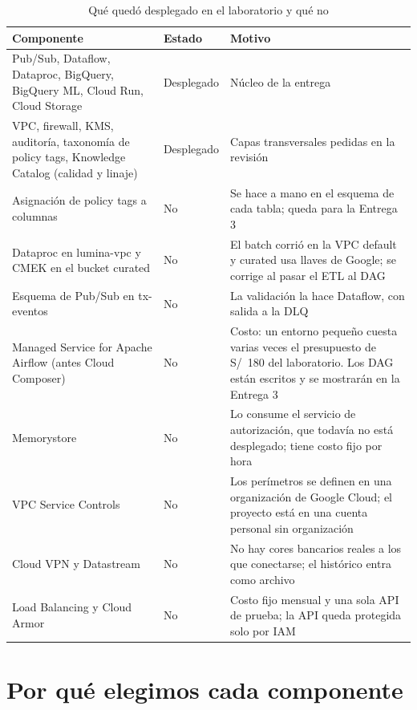 \documentclass[11pt,a4paper]{article}
\DeclareRobustCommand{\cod}[1]{{\small\ttfamily\codbreaks #1}}
\DeclareRobustCommand{\codbreaks}{\let\oldus\_\renewcommand{\_}{\oldus\allowbreak}}
\begin{document}
\begin{table}[H]
\centering\small
\caption{Qué quedó desplegado en el laboratorio y qué no}
\label{tab:desplegado}
\begin{tabularx}{\linewidth}{P{3.6cm}P{2cm}L}
\toprule
\textbf{Componente} & \textbf{Estado} & \textbf{Motivo}\\
\midrule
Pub/Sub, Dataflow, Dataproc, BigQuery, BigQuery ML, Cloud Run, Cloud Storage & Desplegado & Núcleo de la entrega\\
 VPC, firewall, KMS, auditoría, taxonomía de policy tags, Knowledge Catalog (calidad y linaje) & Desplegado & Capas transversales pedidas en la revisión\\
Asignación de policy tags a columnas & No & Se hace a mano en el esquema de cada tabla; queda para la Entrega 3\\
 Dataproc en \cod{lumina-vpc} y CMEK en el bucket curated & No & El batch corrió en la VPC \cod{default} y curated usa llaves de Google; se corrige al pasar el ETL al DAG\\
Esquema de Pub/Sub en \cod{tx-eventos} & No & La validación la hace Dataflow, con salida a la DLQ\\
Managed Service for Apache Airflow (antes Cloud Composer) & No & Costo: un entorno pequeño cuesta varias veces el presupuesto de S/~180 del laboratorio. Los DAG están escritos y se mostrarán en la Entrega 3\\
 Memorystore & No & Lo consume el servicio de autorización, que todavía no está desplegado; tiene costo fijo por hora\\
VPC Service Controls & No & Los perímetros se definen en una organización de Google Cloud; el proyecto está en una cuenta personal sin organización\\
 Cloud VPN y Datastream & No & No hay cores bancarios reales a los que conectarse; el histórico entra como archivo\\
Load Balancing y Cloud Armor & No & Costo fijo mensual y una sola API de prueba; la API queda protegida solo por IAM\\
\bottomrule
\end{tabularx}
\end{table}

\section{Por qué elegimos cada componente}\label{sec:justificacion}
\end{document}
